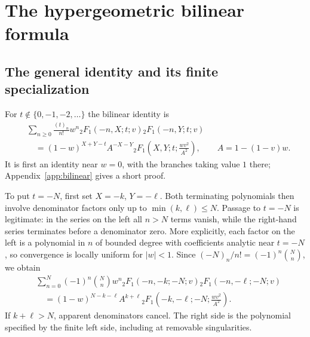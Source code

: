 \documentclass[11pt,reqno]{amsart}
\theoremstyle{remark}\newtheorem{remark}[theorem]{Remark}
\begin{document}
\section{The hypergeometric bilinear formula}
\subsection{The general identity and its finite specialization}
For $t\notin\{0,-1,-2,\ldots\}$ the bilinear identity is
\begin{equation}\label{eq:general-bilinear}
\begin{aligned}
&\sum_{n\ge0}\frac{(t)_n}{n!}w^n
{}_2F_1(-n,X;t;v){}_2F_1(-n,Y;t;v)\\
&\quad=(1-w)^{X+Y-t}A^{-X-Y}
{}_2F_1\left(X,Y;t;\frac{wv^2}{A^2}\right),\qquad
A=1-(1-v)w.
\end{aligned}
\end{equation}
It is first an identity near $w=0$, with the branches taking value $1$
there; Appendix~\ref{app:bilinear} gives a short proof.

To put $t=-N$, first set $X=-k$, $Y=-\ell$. Both terminating
polynomials then involve denominator factors only up to
$\min(k,\ell)\le N$. Passage to $t=-N$ is legitimate: in the series on
the left all $n>N$ terms vanish, while the right-hand series terminates
before a denominator zero. More explicitly, each factor on the left
is a polynomial in $n$ of bounded degree with coefficients analytic
near $t=-N$, so convergence is locally uniform for $|w|<1$.
Since $(-N)_n/n!=(-1)^n\binom Nn$, we obtain
\begin{equation}\label{eq:finite-v}
\begin{aligned}
&\sum_{n=0}^N(-1)^n\binom Nn w^n
{}_2F_1(-n,-k;-N;v){}_2F_1(-n,-\ell;-N;v)\\
&\quad=(1-w)^{N-k-\ell}A^{k+\ell}
{}_2F_1\left(-k,-\ell;-N;\frac{wv^2}{A^2}\right).
\end{aligned}
\end{equation}
If $k+\ell>N$, apparent denominators cancel. The right side is the
polynomial specified by the finite left side, including at removable
singularities.
\end{document}
